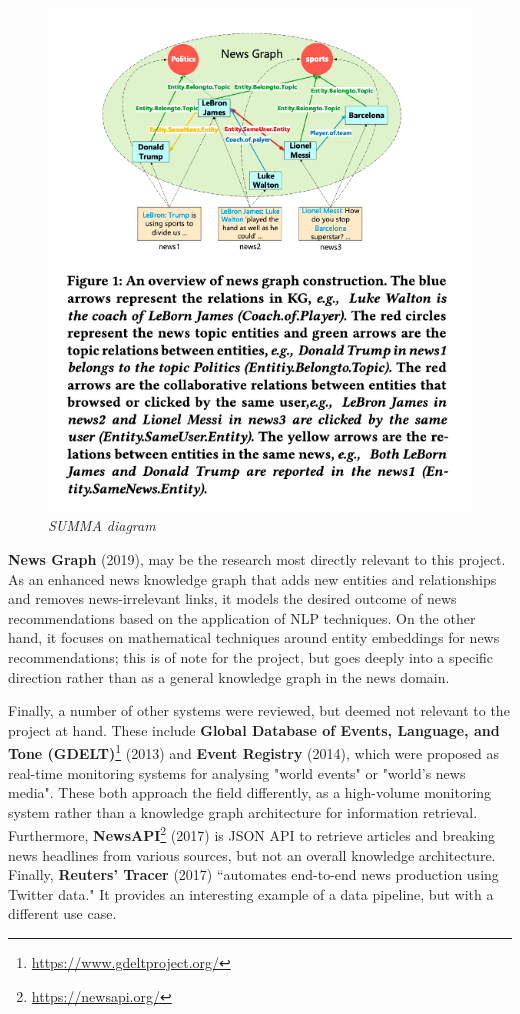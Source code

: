 \documentclass[11pt]{article}
\begin{document}
\begin{figure}
  \centerline{\includegraphics[scale=0.4]{literature-review--newsgraph.png}}
  \caption{\textit{SUMMA diagram}}
\end{figure}

\textbf{News Graph} \cite{liu2019news} (2019), may be the research most directly relevant to this project. As an enhanced news knowledge graph that adds new entities and relationships and removes news-irrelevant links, it models the desired outcome of news recommendations based on the application of NLP techniques. On the other hand, it focuses on mathematical techniques around entity embeddings for news recommendations; this is of note for the project, but goes deeply into a specific direction rather than as a general knowledge graph in the news domain.

Finally, a number of other systems were reviewed, but deemed not relevant to the project at hand. These include \textbf{Global Database of Events, Language, and Tone (GDELT)}\footnote{\url{https://www.gdeltproject.org/}} (2013) and \textbf{Event Registry} \cite{leban2014event} (2014), which were proposed as real-time monitoring systems for analysing "world events" or "world's news media". These both approach the field differently, as a high-volume monitoring system rather than a knowledge graph architecture for information retrieval. Furthermore, \textbf{NewsAPI}\footnote{\url{https://newsapi.org/}} (2017) is JSON API to retrieve articles and breaking news headlines from various sources, but not an overall knowledge architecture. Finally, \textbf{Reuters' Tracer} \cite{liu2017reuters} (2017) ``automates end-to-end news production using Twitter data." It provides an interesting example of a data pipeline, but with a different use case.
\end{document}
